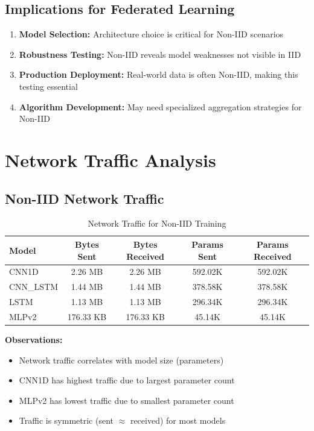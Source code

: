 \documentclass[12pt,a4paper]{article}
\begin{document}
\subsection{Implications for Federated Learning}

\begin{enumerate}
    \item \textbf{Model Selection:} Architecture choice is critical for Non-IID scenarios
    \item \textbf{Robustness Testing:} Non-IID reveals model weaknesses not visible in IID
    \item \textbf{Production Deployment:} Real-world data is often Non-IID, making this testing essential
    \item \textbf{Algorithm Development:} May need specialized aggregation strategies for Non-IID
\end{enumerate}

\section{Network Traffic Analysis}

\subsection{Non-IID Network Traffic}

\begin{table}[h]
\centering
\begin{tabular}{@{}lcccc@{}}
\toprule
\textbf{Model} & \textbf{Bytes Sent} & \textbf{Bytes Received} & \textbf{Params Sent} & \textbf{Params Received} \\
\midrule
CNN1D & 2.26 MB & 2.26 MB & 592.02K & 592.02K \\
CNN\_LSTM & 1.44 MB & 1.44 MB & 378.58K & 378.58K \\
LSTM & 1.13 MB & 1.13 MB & 296.34K & 296.34K \\
MLPv2 & 176.33 KB & 176.33 KB & 45.14K & 45.14K \\
\bottomrule
\end{tabular}
\caption{Network Traffic for Non-IID Training}
\end{table}

\textbf{Observations:}
\begin{itemize}
    \item Network traffic correlates with model size (parameters)
    \item CNN1D has highest traffic due to largest parameter count
    \item MLPv2 has lowest traffic due to smallest parameter count
    \item Traffic is symmetric (sent $\approx$ received) for most models
\end{itemize}
\end{document}
